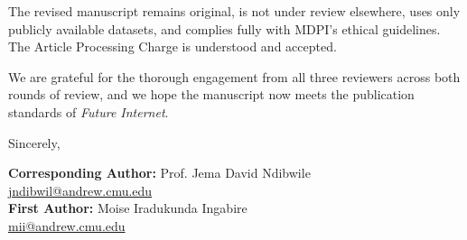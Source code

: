 \documentclass[12pt, a4paper]{article}
\begin{document}
The revised manuscript remains original, is not under review elsewhere, uses only
publicly available datasets, and complies fully with MDPI's ethical guidelines. The
Article Processing Charge is understood and accepted.

We are grateful for the thorough engagement from all three reviewers across both rounds
of review, and we hope the manuscript now meets the publication standards of
\textit{Future Internet}.

\vspace{0.5cm}

\noindent Sincerely,

\vspace{0.8cm}

\noindent\textbf{Corresponding Author:} Prof. Jema David Ndibwile\\
\noindent\href{mailto:jndibwil@andrew.cmu.edu}{jndibwil@andrew.cmu.edu}\\[0.3cm]
\noindent\textbf{First Author:} Moise Iradukunda Ingabire\\
\noindent\href{mailto:mii@andrew.cmu.edu}{mii@andrew.cmu.edu}
\end{document}
